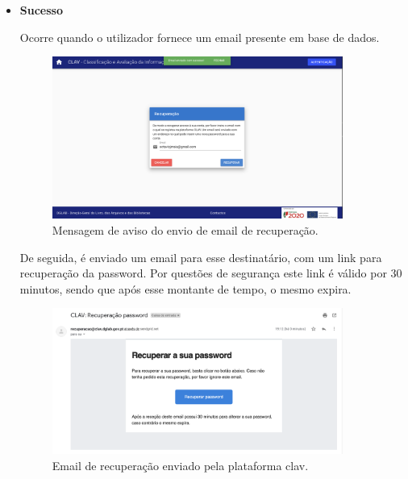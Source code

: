 \vspace{-3mm}
\begin{itemize}
    \item \textbf{Sucesso}
    \vspace{-2mm}
    
    Ocorre quando o utilizador fornece um email presente em base de dados.
    \vspace{-3mm}
    \begin{figure}[H]
        \centering
        \includegraphics[width=0.9\textwidth]{img/clav/recuperacao/recuperacaoEnviado.png}
        \caption{Mensagem de aviso do envio de email de recuperação.}
        \label{fig:envioEmailRecuperacao}
    \end{figure}
    
    De seguida, é enviado um email para esse destinatário, com um link para recuperação da password. Por questões de segurança este link é válido por 30 minutos, sendo que após esse montante de tempo, o mesmo expira.
    
    \begin{figure}[H]
        \centering
        \includegraphics[width=0.9\textwidth]{img/clav/recuperacao/email.png}
        \caption{Email de recuperação enviado pela plataforma \gls{clav}.}
        \label{fig:emailRecuperacao}
    \end{figure}
    

\end{itemize}
